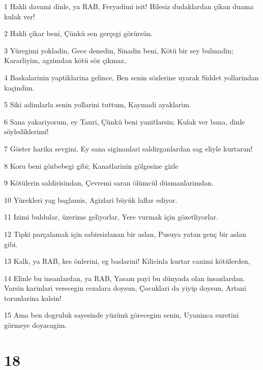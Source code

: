 \par 1 Hakli davami dinle, ya RAB, Feryadimi isit! Hilesiz dudaklardan çikan duama kulak ver!
\par 2 Hakli çikar beni, Çünkü sen gerçegi görürsün.
\par 3 Yüregimi yokladin, Gece denedin, Sinadin beni, Kötü bir sey bulmadin; Kararliyim, agzimdan kötü söz çikmaz,
\par 4 Baskalarinin yaptiklarina gelince, Ben senin sözlerine uyarak Siddet yollarindan kaçindim.
\par 5 Siki adimlarla senin yollarini tuttum, Kaymadi ayaklarim.
\par 6 Sana yakariyorum, ey Tanri, Çünkü beni yanitlarsin; Kulak ver bana, dinle söylediklerimi!
\par 7 Göster harika sevgini, Ey sana siginanlari saldirganlardan sag eliyle kurtaran!
\par 8 Koru beni gözbebegi gibi; Kanatlarinin gölgesine gizle
\par 9 Kötülerin saldirisindan, Çevremi saran ölümcül düsmanlarimdan.
\par 10 Yürekleri yag baglamis, Agizlari büyük laflar ediyor.
\par 11 Izimi buldular, üzerime geliyorlar, Yere vurmak için gözetliyorlar.
\par 12 Tipki parçalamak için sabirsizlanan bir aslan, Pusuya yatan genç bir aslan gibi.
\par 13 Kalk, ya RAB, kes önlerini, eg baslarini! Kilicinla kurtar canimi kötülerden,
\par 14 Elinle bu insanlardan, ya RAB, Yasam payi bu dünyada olan insanlardan. Varsin karinlari verecegin cezalara doysun, Çocuklari da yiyip doysun, Artani torunlarina kalsin!
\par 15 Ama ben dogruluk sayesinde yüzünü görecegim senin, Uyaninca suretini görmeye doyacagim.

\chapter{18}

